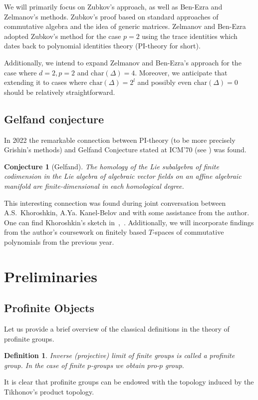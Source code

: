 \documentclass[12pt,a4paper]{article}
\newtheorem*{conjecture*}{Conjecture}
\newtheorem{definition}{Definition}[subsection]
\begin{document}
    We will primarily focus on Zubkov's approach, as well as Ben-Ezra and Zelmanov's methods.
    Zubkov's proof based on standard approaches of commutative algebra and the idea of generic matrices.
    Zelmanov and Ben-Ezra adopted Zubkov's method for the case $p=2$ using the trace identities which dates back to polynomial identities theory (PI-theory for short).

    Additionally, we intend to expand Zelmanov and Ben-Ezra's approach for the case where $d=2, p=2$ and $\mathrm{char}(\Delta)=4$.
    Moreover, we anticipate that extending it to cases where $\mathrm{char}(\Delta)=2^l$ and possibly even $\mathrm{char}(\Delta)=0$ should be relatively straightforward.

    \subsection{Gelfand conjecture}
    In 2022 the remarkable connection between PI-theory (to be more precisely Grishin's methods) and Gelfand Conjecture stated at ICM’70 (see \cite{Gelfand}) was found.
    \vskip 0.1in\noindent
    \begin{conjecture*}[Gelfand]
        The homology of the Lie subalgebra of finite codimension in the Lie algebra of algebraic vector fields on an affine algebraic manifold are finite-dimensional in each
        homological degree.
    \end{conjecture*}
    \vskip 0.1in\noindent
    This interesting connection was found during joint conversation between A.S.\ Khoroshkin, A.Ya. Kanel-Belov and with some assistance from the author.
    One can find Khoroshkin's sketch in~\cite{Feigin-Kanel-Khoroshkin},~\cite{Centrone-Kanel-Khoroshkin-Vorobiov}.
    Additionally, we will incorporate findings from the author's coursework on finitely based $T$-spaces of commutative polynomials from the previous year.


    \section{Preliminaries}

    \subsection{Profinite Objects}
    Let us provide a brief overview of the classical definitions in the theory of profinite groups.
    \vskip 0.1in\noindent
    \begin{definition}
        Inverse (projective) limit of finite groups is called a profinite group.
        In the case of finite $p$-groups we obtain pro-$p$ group.
    \end{definition}
    \vskip 0.1in\noindent
    It is clear that profinite groups can be endowed with the topology induced by the Tikhonov's product topology.
\end{document}
